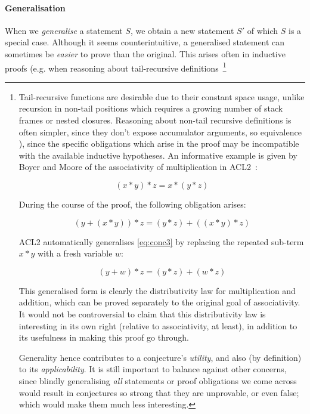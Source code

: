\paragraph{Generalisation}

\providecommand{\coq}[1]{\lstinline[language=ML]|#1|}

When we \emph{generalise} a statement $S$, we obtain a new statement $S'$ of
which $S$ is a special case. Although it seems counterintuitive, a generalised
statement can sometimes be \emph{easier} to prove than the original. This arises
often in inductive proofs (e.g. when reasoning about tail-recursive
definitions~\cite{kapur2003automatic}\footnote{Tail-recursive functions are
  desirable due to their constant space usage, unlike recursion in non-tail
  positions which requires a growing number of stack frames or nested closures.
  Reasoning about non-tail recursive definitions is often simpler, since they
  don't expose accumulator arguments, so equivalence ), since the specific obligations which
arise in the proof may be incompatible with the available inductive hypotheses.
An informative example is given by Boyer and Moore of the associativity of
multiplication in ACL2~\cite{boyer1983proof}:

$$(x * y) * z = x * (y * z)$$

During the course of the proof, the following obligation arises:

\begin{equation}
  \tag{conc3}
  (y + (x * y)) * z = (y * z) + ((x * y) * z)
  \label{eq:conc3}
\end{equation}

ACL2 automatically generalises \eqref{eq:conc3} by replacing the repeated
sub-term $x * y$ with a fresh variable $w$:

\begin{equation}
  \tag{conc4}
  (y + w) * z = (y * z) + (w * z)
  \label{eq:conc4}
\end{equation}

This generalised form is clearly the distributivity law for multiplication and
addition, which can be proved separately to the original goal of
associativity. It would not be controversial to claim that this distributivity
law is interesting in its own right (relative to associativity, at least), in
addition to its usefulness in making this proof go through.


Generality hence contributes to a conjecture's \emph{utility}, and also (by
definition) to its \emph{applicability}. It is still important to balance
against other concerns, since blindly generalising \emph{all} statements or
proof obligations we come across would result in conjectures so strong that they
are unprovable, or even false; which would make them much less interesting.

}
